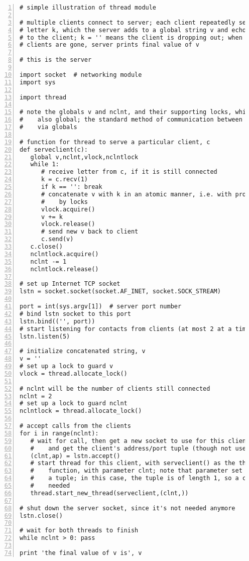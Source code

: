 \begin{Verbatim}[fontsize=\relsize{-2},numbers=left] 
# simple illustration of thread module

# multiple clients connect to server; each client repeatedly sends a
# letter k, which the server adds to a global string v and echos back
# to the client; k = '' means the client is dropping out; when all
# clients are gone, server prints final value of v

# this is the server

import socket  # networking module
import sys

import thread  

# note the globals v and nclnt, and their supporting locks, which are
#    also global; the standard method of communication between threads is
#    via globals

# function for thread to serve a particular client, c
def serveclient(c):
   global v,nclnt,vlock,nclntlock
   while 1:
      # receive letter from c, if it is still connected
      k = c.recv(1)
      if k == '': break
      # concatenate v with k in an atomic manner, i.e. with protection
      #    by locks
      vlock.acquire()
      v += k
      vlock.release()
      # send new v back to client
      c.send(v)
   c.close()
   nclntlock.acquire()
   nclnt -= 1
   nclntlock.release()

# set up Internet TCP socket
lstn = socket.socket(socket.AF_INET, socket.SOCK_STREAM)

port = int(sys.argv[1])  # server port number
# bind lstn socket to this port 
lstn.bind(('', port))
# start listening for contacts from clients (at most 2 at a time)
lstn.listen(5)

# initialize concatenated string, v
v = ''
# set up a lock to guard v
vlock = thread.allocate_lock()  

# nclnt will be the number of clients still connected
nclnt = 2
# set up a lock to guard nclnt
nclntlock = thread.allocate_lock()  

# accept calls from the clients
for i in range(nclnt):
   # wait for call, then get a new socket to use for this client,
   #    and get the client's address/port tuple (though not used)
   (clnt,ap) = lstn.accept()
   # start thread for this client, with serveclient() as the thread's
   #    function, with parameter clnt; note that parameter set must be
   #    a tuple; in this case, the tuple is of length 1, so a comma is
   #    needed
   thread.start_new_thread(serveclient,(clnt,))

# shut down the server socket, since it's not needed anymore 
lstn.close()

# wait for both threads to finish 
while nclnt > 0: pass

print 'the final value of v is', v
\end{Verbatim}

